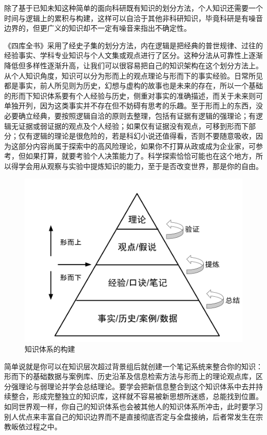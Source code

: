 \documentclass[]{tufte-book}
\begin{document}
除了基于已知未知这种简单的面向科研既有知识的划分方法，个人知识还需要一个时间与逻辑上的累积与构建，这样可以自洽于其他非科研知识，毕竟科研是有噪音边界的，但更广义的知识却不一定有噪音来指出不确定性。

《四库全书》采用了经史子集的划分方法，内在逻辑是把经典的普世规律、过往的经验事实、学科专业知识与个人文集或观点进行了区分。这种分法从可靠性上逐渐降低但多样性逐渐升高，让我们可以很容易把自己的知识架构在这个划分方法上。从个人知识角度，知识可以分为形而上的观点理论与形而下的事实经验。日常所见都是事实，前人所见则为历史，幻想与虚构的故事也是未来的存在，所以一个基础的形而下知识体系要有个人经验与历史，侧重对事实的准确描述，而关于未来则可单独开列，因为这类事实并不存在但不妨碍有思考的乐趣。至于形而上的东西，没必要确立经典，要按照逻辑自洽的原则去整理，包括有证据有逻辑的强理论；有逻辑无证据或弱证据的观点及个人经验；如果仅有证据没有观点，可移到形而下部分；仅有逻辑的理论是很危险的，若是科幻小说还值得看，否则不要随意吸收，因为这部分内容尚属于探索中的高风险理论，如果你不打算从政或成为企业家，可参考，但如果打算，就要考验个人决策能力了。科学探索恰恰可能也在这个地方，所以得学会用从观察与实验中提炼知识的能力，至于是否改变世界，那是你的自由。

\begin{figure}
\includegraphics{data/knowledge} \caption[知识体系的构建]{知识体系的构建}\label{fig:unnamed-chunk-2}
\end{figure}

简单说就是你可以在知识层次超过背景组后就创建一个笔记系统来整合你的知识：形而下的基础数据与案例库、历史沿革及信息检索方法与形而上的理论观点库，区分强理论与弱理论并学会总结理论。要学会把新信息整合到这个知识体系中去并持续整合，形成完整独立的知识库，这样就不容易被新思想所迷惑，总能找到位置。如同世界观一样，你自己的知识体系也会被其他人的知识体系所冲击，此时要学习别人优点来丰富自己的知识边界而不是直接彻底否定与全盘接纳，后者常发生在宗教皈依过程之中。
\end{document}
